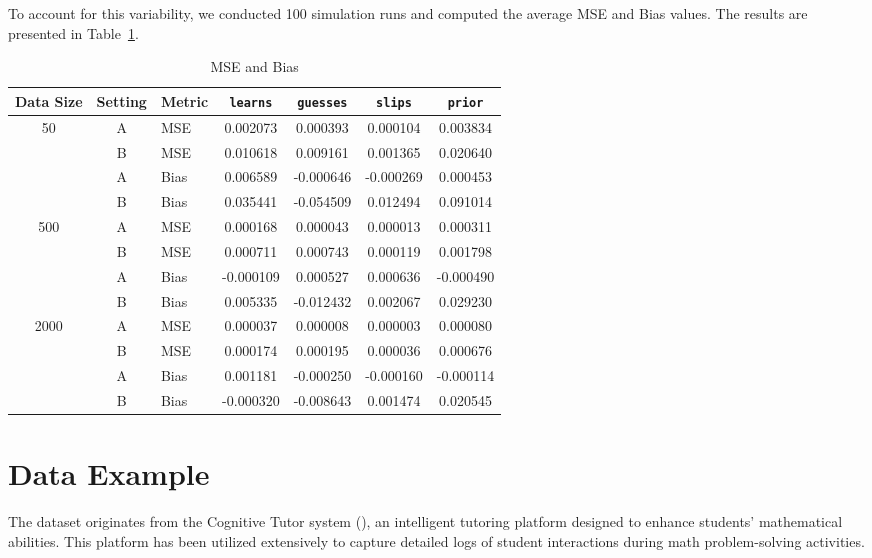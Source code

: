 \documentclass{article}
\begin{document}
To account for this variability, we conducted 100 simulation runs and computed the average MSE and Bias values. The results are presented in Table~\ref{tab:mse-bias-comparison}.
\begin{table}[H]
\centering
\caption{MSE and Bias}
\label{tab:mse-bias-comparison}
\begin{tabular}{@{}cclcccc@{}}
\toprule
\textbf{Data Size} & \textbf{Setting} & \textbf{Metric} & \texttt{learns} & \texttt{guesses} & \texttt{slips} & \texttt{prior} \\ 
\midrule
\multirow{4}{*}{50}  
    & A & MSE  & 0.002073 & 0.000393 & 0.000104 & 0.003834 \\  
    & B & MSE  & 0.010618 & 0.009161 & 0.001365 & 0.020640 \\  
    & A & Bias & 0.006589 & -0.000646 & -0.000269 & 0.000453 \\  
    & B & Bias & 0.035441 & -0.054509 & 0.012494 & 0.091014 \\  
\midrule
\multirow{4}{*}{500}  
    & A & MSE  & 0.000168 & 0.000043 & 0.000013 & 0.000311 \\  
    & B & MSE  & 0.000711 & 0.000743 & 0.000119 & 0.001798 \\  
    & A & Bias & -0.000109 & 0.000527 & 0.000636 & -0.000490 \\  
    & B & Bias & 0.005335 & -0.012432 & 0.002067 & 0.029230 \\  
\midrule
\multirow{4}{*}{2000}  
    & A & MSE  & 0.000037 & 0.000008 & 0.000003 & 0.000080 \\  
    & B & MSE  & 0.000174 & 0.000195 & 0.000036 & 0.000676 \\  
    & A & Bias & 0.001181 & -0.000250 & -0.000160 & -0.000114 \\  
    & B & Bias & -0.000320 & -0.008643 & 0.001474 & 0.020545 \\  
\bottomrule
\end{tabular}
\end{table}

\section{Data Example}

The dataset originates from the Cognitive Tutor system (\cite{ritter2007cognitive}), an intelligent tutoring platform designed to enhance students' mathematical abilities. This platform has been utilized extensively to capture detailed logs of student interactions during math problem-solving activities.
\end{document}
